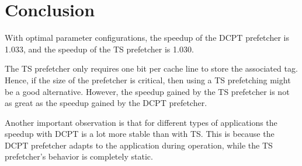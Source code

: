 \section{Conclusion}

With optimal parameter configurations, the speedup of the DCPT prefetcher is
1.033, and the speedup of the TS prefetcher is 1.030.

The TS prefetcher only requires one bit per cache line to store the associated
tag. Hence, if the size of the prefetcher is critical, then using a TS
prefetching might be a good alternative. However, the speedup gained by the TS
prefetcher is not as great as the speedup gained by the DCPT prefetcher.

Another important observation is that for different types of applications the
speedup with DCPT is a lot more stable than with TS. This is because the DCPT
prefetcher adapts to the application during operation, while the TS prefetcher's
behavior is completely static.

